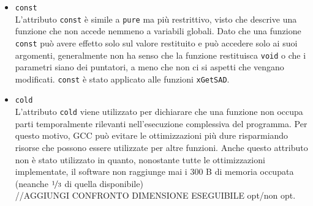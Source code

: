 \begin{itemize}
	\item\verb|const|\\
	L'attributo \verb|const| è simile a \verb|pure| ma più restrittivo, visto 
	che descrive una funzione che non accede nemmeno a variabili globali.
	Dato che una funzione \verb|const| può avere effetto solo sul valore 
	restituito e può accedere solo ai suoi argomenti, generalmente non ha senso 
	che la funzione restituisca \verb|void| o che i parametri siano dei 
	puntatori, a meno che non ci si aspetti che vengano modificati. 
	\verb|const| è stato applicato alle funzioni \verb|xGetSAD|.
	
	\item\verb|cold|\\
	L'attributo \verb|cold| viene utilizzato per dichiarare che una funzione 
	non occupa parti temporalmente rilevanti nell'esecuzione complessiva del 
	programma. Per questo motivo, GCC può evitare le ottimizzazioni più dure 
	risparmiando risorse che possono essere utilizzate per altre funzioni. 
	Anche questo attributo non è stato utilizzato in quanto, nonostante tutte 
	le ottimizzazioni implementate, il software non raggiunge mai i $300$ B di 
	memoria occupata (neanche $\nicefrac{1}{3}$ di quella disponibile) 
	\\ //AGGIUNGI CONFRONTO DIMENSIONE ESEGUIBILE opt/non opt.
\end{itemize}

